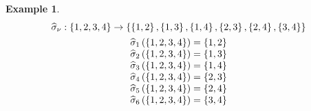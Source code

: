 \documentclass[aps,preprint]{revtex4}%
\newtheorem{example}[theorem]{Example}
\begin{document}
\begin{example}%
\begin{gather}
\widehat{\sigma}_{\nu}:\left\{  1,2,3,4\right\}  \rightarrow\left\{  \left\{
1,2\right\}  ,\left\{  1,3\right\}  ,\left\{  1,4\right\}  ,\left\{
2,3\right\}  ,\left\{  2,4\right\}  ,\left\{  3,4\right\}  \right\} \\%
\begin{array}
[c]{c}%
\widehat{\sigma}_{1}\left(  \left\{  1,2,3,4\right\}  \right)  =\left\{
1,2\right\} \\
\widehat{\sigma}_{2}\left(  \left\{  1,2,3,4\right\}  \right)  =\left\{
1,3\right\} \\
\widehat{\sigma}_{3}\left(  \left\{  1,2,3,4\right\}  \right)  =\left\{
1,4\right\} \\
\widehat{\sigma}_{4}\left(  \left\{  1,2,3,4\right\}  \right)  =\left\{
2,3\right\} \\
\widehat{\sigma}_{5}\left(  \left\{  1,2,3,4\right\}  \right)  =\left\{
2,4\right\} \\
\widehat{\sigma}_{6}\left(  \left\{  1,2,3,4\right\}  \right)  =\left\{
3,4\right\}
\end{array}
\end{gather}

\end{example}
\end{document}
